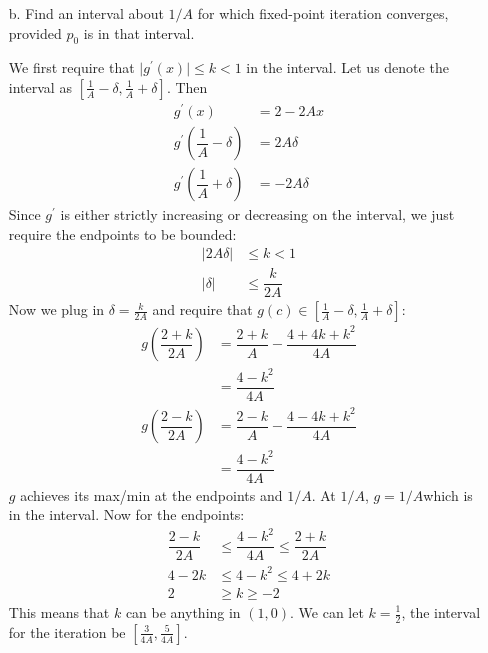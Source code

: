 \documentclass{article}
\begin{document}
\begin{itemize}
        \item [b.] Find an interval about $1 / A$ for which fixed-point iteration converges, provided $p_{0}$ is in that interval. 
            \begin{answer}
                We first require that $\lvert g^{\prime}(x) \rvert \leq k < 1$ in the interval. Let us denote the interval as $[\frac{1}{A} - \delta, \frac{1}{A} + \delta]$. Then  
                    \begin{align*}
                        g^{\prime}(x)                                &= 2 - 2Ax   \\
                        g^{\prime}\left(\dfrac{1}{A} - \delta\right) &= 2A\delta  \\
                        g^{\prime}\left(\dfrac{1}{A} + \delta\right) &= -2A\delta   
                    \end{align*}
                Since $g^{\prime}$ is either strictly increasing or decreasing on the interval, we just require the endpoints to be bounded:
                    \begin{align*}
                        \lvert 2A\delta \rvert &\leq k < 1 \\
                        \lvert \delta \rvert & \leq \dfrac{k}{2A}
                    \end{align*}
                Now we plug in $\delta = \frac{k}{2A}$ and require that $g(c) \in [\frac{1}{A} - \delta, \frac{1}{A} + \delta]$:
                    \begin{align*}
                        g\left(\dfrac{2 + k}{2A}\right) &= \dfrac{2 + k}{A} - \dfrac{4 + 4k + k^{2}}{4A} \\
                                                        &= \dfrac{4 - k^{2}}{4A}                         \\
                        g\left(\dfrac{2 - k}{2A}\right) &= \dfrac{2 - k}{A} - \dfrac{4 - 4k + k^{2}}{4A} \\
                                                        &= \dfrac{4 - k^{2}}{4A}                           
                    \end{align*}
                $g$ achieves its max/min at the endpoints and $1/A$. At $1/A$, $g = 1/A$which is in the interval. Now for the endpoints:
                    \begin{align*}
                        \dfrac{2 - k}{2A} &\leq \dfrac{4 - k^{2}}{4A} \leq \dfrac{2 + k}{2A} \\
                        4 - 2k            &\leq  4 - k^{2} \leq 4 + 2k                       \\
                        2                 &\geq k \geq -2                                      
                    \end{align*}
                This means that $k$ can be anything in $(1, 0)$. We can let $k = \frac{1}{2}$, the interval for the iteration be $[\frac{3}{4A}, \frac{5}{4A}]$.

            \end{answer}
    \end{itemize}
\end{document}

